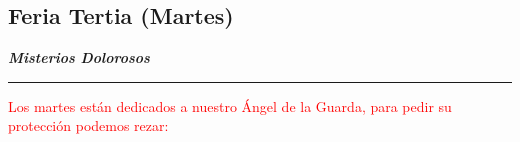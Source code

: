 \documentclass[10pt,twoside]{book}
\begin{document}
\begin{center}
      \section*{Feria Tertia (Martes)}

      \textbf{\textsl{\large Misterios Dolorosos}}
\end{center}

\vspace{0.5em}



\vspace{0.5em}



\vspace{0.75em}





\vspace{0.75em}





\vspace{0.75em}





\vspace{0.75em}



{}

\iralfinal

\begin{center}
      {\rule{10em}{0.4pt}}

      \vspace{0.75em}

      \textcolor{red}{Los martes están dedicados a nuestro Ángel de la Guarda, para pedir su protección podemos rezar:}
\end{center}

\begin{multicols}{2}

      

\end{multicols}
\end{document}
